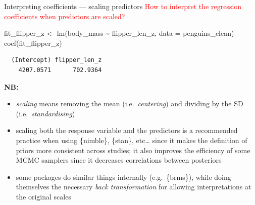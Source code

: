 \documentclass[
  10pt,
  ignorenonframetext,
  aspectratio=169,
  t]{beamer}
\newenvironment{Shaded}{\begin{snugshade}}{\end{snugshade}}
\newcommand{\AttributeTok}[1]{\textcolor[rgb]{0.40,0.45,0.13}{#1}}
\newcommand{\FunctionTok}[1]{\textcolor[rgb]{0.28,0.35,0.67}{#1}}
\newcommand{\NormalTok}[1]{\textcolor[rgb]{0.00,0.23,0.31}{#1}}
\newcommand{\OtherTok}[1]{\textcolor[rgb]{0.00,0.23,0.31}{#1}}
\newcommand{\SpecialCharTok}[1]{\textcolor[rgb]{0.37,0.37,0.37}{#1}}
\providecommand{\tightlist}{%
  \setlength{\itemsep}{0pt}\setlength{\parskip}{0pt}}
\newcommand{\blueit}[1]{\textcolor{bluebeamer}{\emph{#1}}}
\begin{document}
\begin{frame}[fragile]{Interpreting coefficients --- scaling predictors}
\protect{}\label{interpreting-coefficients-scaling-predictors}
\textcolor{red}{How to interpret the regression coefficients when predictors are scaled?}

\footnotesize

\begin{Shaded}
\begin{Highlighting}[]
\NormalTok{fit\_flipper\_z }\OtherTok{\textless{}{-}} \FunctionTok{lm}\NormalTok{(body\_mass }\SpecialCharTok{\textasciitilde{}}\NormalTok{ flipper\_len\_z, }\AttributeTok{data =}\NormalTok{ penguins\_clean)}
\FunctionTok{coef}\NormalTok{(fit\_flipper\_z)}
\end{Highlighting}
\end{Shaded}

\begin{verbatim}
  (Intercept) flipper_len_z 
    4207.0571      702.9364 
\end{verbatim}

\normalsize

\pause

\textbf{NB:}

\begin{itemize}
\tightlist
\item
  \blueit{scaling} means removing the mean (i.e.~\blueit{centering}) and
  dividing by the SD (i.e.~\blueit{standardising})
\item
  scaling both the response variable and the predictors is a recommended
  practice when using \{nimble\}, \{stan\}, etc\ldots{} since it makes
  the definition of priors more consistent across studies; it also
  improves the efficiency of some MCMC samplers since it decreases
  correlations between posteriors
\item
  some packages do similar things internally (e.g.~\{brms\}), while
  doing themselves the necessary \blueit{back transformation} for
  allowing interpretations at the original scales
\end{itemize}
\end{frame}
\end{document}
